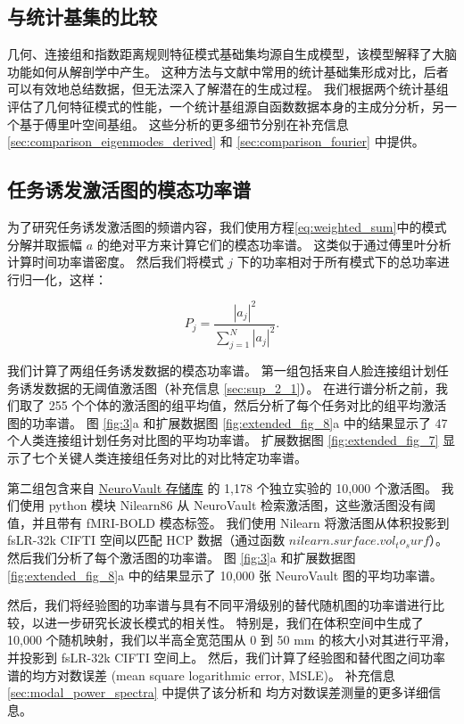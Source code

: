 \documentclass[lang=cn,a4paper,newtx]{elegantpaper}
\begin{document}
\subsection{与统计基集的比较} \label{sec:sets_comparisons}

几何、连接组和指数距离规则特征模式基础集均源自生成模型，该模型解释了大脑功能如何从解剖学中产生。
这种方法与文献中常用的统计基础集形成对比，后者可以有效地总结数据，但无法深入了解潜在的生成过程。
我们根据两个统计基组评估了几何特征模式的性能，一个统计基组源自函数数据本身的主成分分析，另一个基于傅里叶空间基组。
这些分析的更多细节分别在补充信息\ref{sec:comparison_eigenmodes_derived} 和 \ref{sec:comparison_fourier} 中提供。

\subsection{任务诱发激活图的模态功率谱} \label{sec:modal_power}

为了研究任务诱发激活图的频谱内容，我们使用方程\ref{eq:weighted_sum}中的模式分解并取振幅 $ a $ 的绝对平方来计算它们的模态功率谱。
这类似于通过傅里叶分析计算时间功率谱密度。
然后我们将模式 $ j $ 下的功率相对于所有模式下的总功率进行归一化，这样：

\begin{equation}\label{eq:normalized_power}
	P_j = \frac{|a_j|^2}{\sum_{j=1}^{N} |a_j|^2 }.
\end{equation}

我们计算了两组任务诱发数据的模态功率谱。
第一组包括来自人脸连接组计划任务诱发数据的无阈值激活图（补充信息 \ref{sec:sup_2_1}）。
在进行谱分析之前，我们取了 255 个个体的激活图的组平均值，然后分析了每个任务对比的组平均激活图的功率谱。
图 \ref{fig:3}a 和扩展数据图 \ref{fig:extended_fig_8}a 中的结果显示了 47 个人类连接组计划任务对比图的平均功率谱。 
扩展数据图 \ref{fig:extended_fig_7} 显示了七个关键人类连接组任务对比的对比特定功率谱。


第二组包含来自 \href{https://neuroVault.org/}{NeuroVault 存储库}\cite{gorgolewski2015neurovault} 的 1,178 个独立实验的 10,000 个激活图。
我们使用 python 模块 Nilearn86 从 NeuroVault 检索激活图，这些激活图没有阈值，并且带有 fMRI-BOLD 模态标签。
我们使用 Nilearn 将激活图从体积投影到 fsLR-32k CIFTI 空间以匹配 HCP 数据（通过函数 $ nilearn.surface.vol_to_surf $）。
然后我们分析了每个激活图的功率谱。
图 \ref{fig:3}a 和扩展数据图 \ref{fig:extended_fig_8}a 中的结果显示了 10,000 张 NeuroVault 图的平均功率谱。


然后，我们将经验图的功率谱与具有不同平滑级别的替代随机图的功率谱进行比较，以进一步研究长波长模式的相关性。
特别是，我们在体积空间中生成了 10,000 个随机映射，我们以半高全宽范围从 0 到 50 mm 的核大小对其进行平滑，并投影到 fsLR-32k CIFTI 空间上。
然后，我们计算了经验图和替代图之间功率谱的均方对数误差 (mean square logarithmic error, MSLE)。
补充信息 \ref{sec:modal_power_spectra} 中提供了该分析和 均方对数误差测量的更多详细信息。
\end{document}
